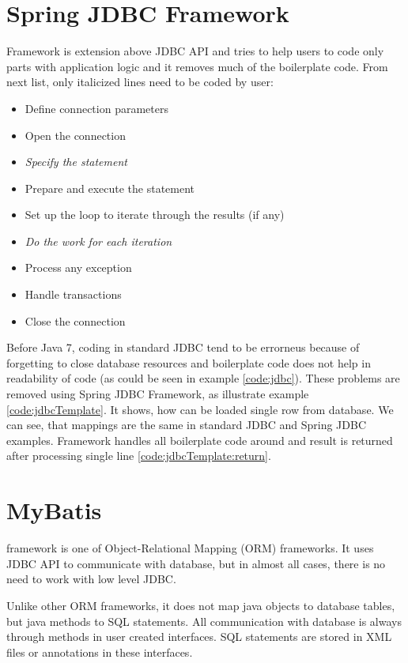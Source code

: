 \section{Spring JDBC Framework \label{frameworks:jdbcTemplate}}
\citet{SpringJDBC} Framework is extension above JDBC API and tries to help users to code only
parts with application logic and it removes much of the boilerplate code.
From next list, only italicized lines need to be coded by user:
\begin{itemize}
  \item Define connection parameters
  \item Open the connection
  \item \textit{Specify the statement}
  \item Prepare and execute the statement
  \item Set up the loop to iterate through the results (if any)
  \item \textit{Do the work for each iteration}
  \item Process any exception
  \item Handle transactions
  \item Close the connection   
\end{itemize}

Before Java 7, coding in standard JDBC tend to be errorneus because of forgetting to close
database resources and boilerplate code does not help in readability of code
(as could be seen in example \ref{code:jdbc}). These problems are removed using Spring JDBC Framework,
as illustrate example \ref{code:jdbcTemplate}. It shows, how can be loaded single row from database.
We can see, that mappings are the same in standard JDBC and Spring JDBC examples.
Framework handles all boilerplate code around and result is returned after processing single line \ref{code:jdbcTemplate:return}.







\section{MyBatis \label{frameworks:myBatis}}

\citet{MyBatis} framework is one of Object-Relational Mapping (ORM) frameworks.
It uses JDBC API to communicate with database, but in almost all cases, there is no need
to work with low level JDBC.

Unlike other ORM frameworks, it does not map java objects to database tables, but java methods
to SQL statements. All communication with database is always through methods in user created interfaces.
SQL statements are stored in XML files or annotations in these interfaces.

